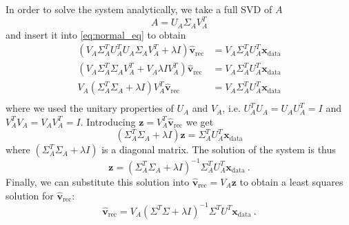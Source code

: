 \documentclass[a4paper]{article}
\begin{document}
In order to solve the system analytically, we take a full SVD of $A$
\begin{equation}
    A = U_A \Sigma_A V_A^T
\end{equation}
and insert it into \eqref{eq:normal_eq} to obtain
\begin{align}
    (V_A\Sigma_A^T U_A^T U_A \Sigma_A V_A^T + \lambda I)\hat{\mathbf{v}}_\mathrm{rec} &= V_A\Sigma_A^T U_A^T \mathbf{x}_\mathrm{data}\\
    \label{eq:unitary}
    (V_A\Sigma_A^T \Sigma_A V_A^T + V_A \lambda I V_A^T)\hat{\mathbf{v}}_\mathrm{rec} &= V_A\Sigma_A^T U_A^T \mathbf{x}_\mathrm{data}\\
    V_A(\Sigma_A^T \Sigma_A + \lambda I) V_A^T \hat{\mathbf{v}}_\mathrm{rec} &= V_A\Sigma_A^T U_A^T \mathbf{x}_\mathrm{data}\\
\end{align}
where we used the unitary properties of $U_A$ and $V_A$, i.e. $U_A^T U_A = U_A U_A^T= I$ and $V_A^T V_A = V_A V_A^T= I$.
Introducing $\mathbf{z} = V_A^T \hat{\mathbf{v}}_\mathrm{rec}$ we get
\begin{equation}
    (\Sigma_A^T \Sigma_A + \lambda I) \mathbf{z} = \Sigma_A^T U_A^T \mathbf{x}_\mathrm{data}
\end{equation}
where $(\Sigma_A^T \Sigma_A + \lambda I)$ is a diagonal matrix. The solution of the system is thus
\begin{equation}
    \mathbf{z} = (\Sigma_A^T \Sigma_A + \lambda I)^{-1} \Sigma_A^T U_A^T \mathbf{x}_\mathrm{data}~.
\end{equation}
Finally, we can substitute this solution into $\hat{\mathbf{v}}_\mathrm{rec} = V_A \mathbf{z}$ to obtain a least squares solution for $\hat{\mathbf{v}}_\mathrm{rec}$:
\begin{equation}
    \hat{\mathbf{v}}_\mathrm{rec} = V_A (\Sigma^T \Sigma + \lambda I)^{-1} \Sigma^T U^T \mathbf{x}_\mathrm{data}~.
\end{equation}


\end{document}
